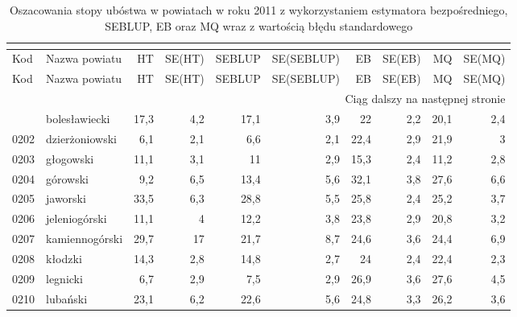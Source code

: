 \begin{center}
\footnotesize
\begin{longtable}{lp{3cm}rrrrrrrr}
\caption{Oszacowania stopy ubóstwa w powiatach w roku 2011 z wykorzystaniem estymatora bezpośredniego, SEBLUP, EB oraz MQ wraz z wartością błędu standardowego}\\
\label{tab:pow_hcr}\\
\hline
Kod & Nazwa powiatu & HT & SE(HT) & SEBLUP & SE(SEBLUP) & EB & SE(EB) & MQ & SE(MQ) \\
  \hline
\endfirsthead
  \hline
Kod & Nazwa powiatu & HT & SE(HT) & SEBLUP & SE(SEBLUP) & EB & SE(EB) & MQ & SE(MQ) \\
  \hline
\endhead
\hline \multicolumn{10}{|r|}{{Ciąg dalszy na następnej stronie}} \\
\hline
\endfoot
\hline
\endlastfoot
\hline
0201 & bolesławiecki           & 17,3    & 4,2         & 17,1     & 3,9          & 22       & 2,2          & 20,1     & 2,4          \\
0202 & dzierżoniowski          & 6,1     & 2,1         & 6,6      & 2,1          & 22,4     & 2,9          & 21,9     & 3            \\
0203 & głogowski               & 11,1    & 3,1         & 11       & 2,9          & 15,3     & 2,4          & 11,2     & 2,8          \\
0204 & górowski                & 9,2     & 6,5         & 13,4     & 5,6          & 32,1     & 3,8          & 27,6     & 6,6          \\
0205 & jaworski                & 33,5    & 6,3         & 28,8     & 5,5          & 25,8     & 2,4          & 25,2     & 3,7          \\
0206 & jeleniogórski           & 11,1    & 4           & 12,2     & 3,8          & 23,8     & 2,9          & 20,8     & 3,2          \\
0207 & kamiennogórski          & 29,7    & 17          & 21,7     & 8,7          & 24,6     & 3,6          & 24,4     & 6,9          \\
0208 & kłodzki                 & 14,3    & 2,8         & 14,8     & 2,7          & 24       & 2,4          & 22,4     & 2,3          \\
0209 & legnicki                & 6,7     & 2,9         & 7,5      & 2,9          & 26,9     & 3,6          & 27,6     & 4,5          \\
0210 & lubański                & 23,1    & 6,2         & 22,6     & 5,6          & 24,8     & 3,3          & 26,2     & 3,6          \\

\end{longtable}
\end{center}
